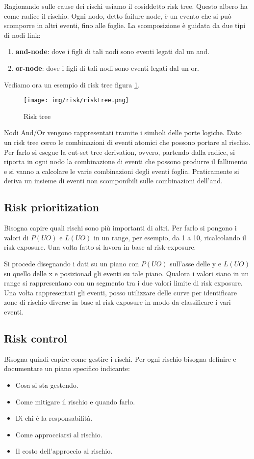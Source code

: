 Ragionando sulle cause dei rischi usiamo il cosiddetto risk tree. Questo albero ha come radice il rischio. Ogni nodo, detto failure node, è un evento che si può scomporre in altri eventi, fino alle foglie. La scomposizione è guidata da due tipi di nodi link:
\begin{enumerate}
    \item \textbf{and-node}: dove i figli di tali nodi sono eventi legati dal un and.
    \item \textbf{or-node}: dove i figli di tali nodi sono eventi legati dal un or.
\end{enumerate}
\begin{esempio}
    Vediamo ora un esempio di risk tree figura \ref{fig:risk-tree}.
    \begin{figure}[!ht]
        \centering
        \texttt{[image: img/risk/risktree.png]}
        \caption{Risk tree}
        \label{fig:risk-tree}
    \end{figure}
\end{esempio}
Nodi And/Or vengono rappresentati tramite i simboli delle porte logiche. Dato un risk tree cerco le combinazioni di eventi atomici che possono portare al rischio. Per farlo si esegue la cut-set tree derivation, ovvero, partendo dalla radice, si riporta in ogni nodo la combinazione di eventi che possono produrre il fallimento e si vanno a calcolare le varie combinazioni degli eventi foglia. Praticamente si deriva un insieme di eventi non scomponibili sulle combinazioni dell'and.
\subsection{Risk prioritization}
Bisogna capire quali rischi sono più importanti di altri. Per farlo si pongono i valori di $P(UO)$ e $L(UO)$ in un range, per esempio, da 1 a 10, ricalcolando il risk exposure. Una volta fatto si lavora in base al risk-exposure.

Si procede disegnando i dati su un piano con $P(UO)$ sull'asse delle y e $L(UO)$ su quello delle x e posizionad gli eventi su tale piano. Qualora i valori siano in un range si rappresentano con un segmento tra i due valori limite di risk exposure. Una volta rappresentati gli eventi, posso utilizzare delle curve per identificare zone di rischio diverse in base al risk exposure in modo da classificare i vari eventi.
\subsection{Risk control}
Bisogna quindi capire come gestire i rischi. Per ogni rischio bisogna definire e documentare un piano specifico indicante:
\begin{itemize}
    \item Cosa si sta gestendo.
    \item Come mitigare il rischio e quando farlo.
    \item Di chi è la responsabilità.
    \item Come approcciarsi al rischio.
    \item Il costo dell'approccio al rischio.
\end{itemize}

